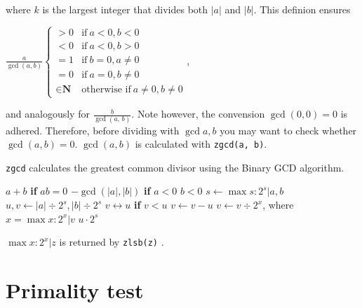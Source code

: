 \noindent
where $k$ is the largest integer that divides
both $\lvert a \rvert$ and $\lvert b \rvert$. This
definion ensures

\vspace{1em}
\( \displaystyle{
    \frac{a}{\gcd(a, b)} \left \lbrace \begin{array}{rl}
        > 0 & \textrm{if}~ a < 0, b < 0 \\
        < 0 & \textrm{if}~ a < 0, b > 0 \\
        = 1 & \textrm{if}~ b = 0, a \neq 0 \\
        = 0 & \textrm{if}~ a = 0, b \neq 0 \\
        \in \textbf{N} & \textrm{otherwise if}~ a \neq 0, b \neq 0
    \end{array} \right .
}\),
\vspace{1em}

\noindent
and analogously for $\frac{b}{\gcd(a,\,b)}$. Note however,
the convension $\gcd(0, 0) = 0$ is adhered. Therefore,
before dividing with $\gcd{a, b}$ you may want to check
whether $\gcd(a, b) = 0$. $\gcd(a, b)$ is calculated
with {\tt zgcd(a, b)}.

{\tt zgcd} calculates the greatest common divisor using
the Binary GCD algorithm.

\vspace{1em}
\hspace{-2.8ex}
\begin{minipage}{\linewidth}
\begin{algorithmic}
    \RETURN $a + b$ {\bf if} $ab = 0$
    \RETURN $-\gcd(\lvert a \rvert, \lvert b \rvert)$ {\bf if} $a < 0$ \AND $b < 0$
    \STATE $s \gets \max s : 2^s \vert a, b$
    \STATE $u, v \gets \lvert a \rvert \div 2^s, \lvert b \rvert \div 2^s$
        \STATE $v \leftrightarrow u$ {\bf if} $v < u$
        \STATE $v \gets v - u$
        \STATE $v \gets v \div 2^x$, where $x = \max x : 2^x \vert v$
    \ENDWHILE
    \RETURN $u \cdot 2^s$
\end{algorithmic}
\end{minipage}
\vspace{1em}

\noindent
$\max x : 2^x \vert z$ is returned by {\tt zlsb(z)}
.


\newpage
\section{Primality test}
\label{sec:Primality test}

